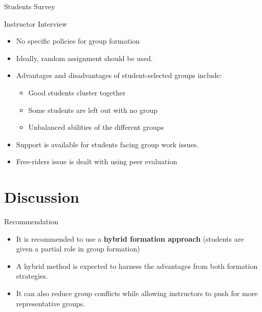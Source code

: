 \documentclass[12pt,table,aspectratio=169]{beamer}
\begin{document}
\begin{frame}{Students Survey}
    
\end{frame}


\begin{frame}{Instructor Interview}
\addtolength{\leftmargini}{\labelsep}
\begin{itemize}
        \item No specific policies for group formation
        \item Ideally, random assignment should be used.
        \item Advantages and disadvantages of student-selected groups include:
        \begin{itemize}
            \item {\color{green!50!black}Good students cluster together}
            \item {\color{red}Some students are left out with no group}
            \item {\color{red}Unbalanced abilities of the different groups}
        \end{itemize}
        \item Support is available for students facing group work issues.
        \item Free-riders issue is dealt with using peer evaluation
    \end{itemize}
\end{frame}

\section{Discussion}

\begin{frame}{Recommendation}
\begin{itemize}
    \item It is recommended to use a \textbf{hybrid formation approach} (students are given a partial role in group formation)
    \item A hybrid method is expected to harness the advantages from both formation strategies.
    \item It can also reduce group conflicts while allowing instructors to push for more representative groups.
\end{itemize}
\end{frame}
\end{document}
